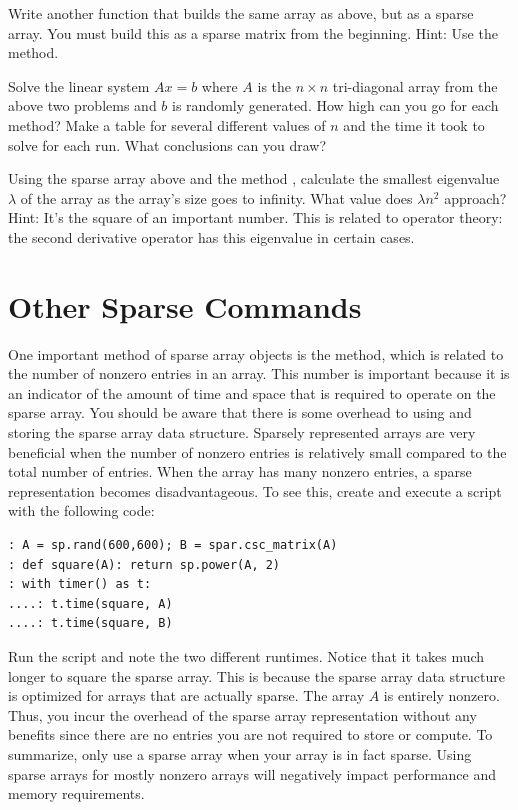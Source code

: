 \begin{problem}
Write another function that builds the same array as above, but as a sparse array. You must build this as a sparse matrix from the beginning. Hint: Use the  method.
\end{problem}

\begin{problem}
Solve the linear system $Ax = b$ where $A$ is the $n\times n$
tri-diagonal array from the above two problems and $b$ is randomly
generated.  How high can you go for each method?  Make a table for
several different values of $n$ and the time it took to solve for
each run.  What conclusions can you draw?
\end{problem}

\begin{problem}
Using the sparse array above and the method , calculate the smallest eigenvalue $\lambda$ of the array as the array's size goes to infinity. What value does $\lambda n^2$ approach?  Hint: It's the square of an important number. This is related to operator theory: the second derivative operator has this eigenvalue in certain cases.
\end{problem}

\section*{Other Sparse Commands}

One important method of sparse array objects is the  method, which is related to the number of nonzero entries in an array.  This number is important because it is an indicator of the amount of time and space that is required to operate on the sparse array. You should be aware that there is some overhead to using and storing the sparse array data structure. Sparsely represented arrays are very beneficial when the number of nonzero entries is relatively small compared to the total number of entries. When the array has many nonzero entries, a sparse representation becomes disadvantageous. To see this, create and execute a script with the following code:
\begin{lstlisting}[style=python]
: A = sp.rand(600,600); B = spar.csc_matrix(A)
: def square(A): return sp.power(A, 2)
: with timer() as t:
....: t.time(square, A)
....: t.time(square, B)
\end{lstlisting}

Run the script and note the two different runtimes. Notice that it takes much longer to square the sparse array. This is because the sparse array data structure is optimized for arrays that are actually sparse. The array $A$ is entirely nonzero. Thus, you incur the overhead of the sparse array representation without any benefits since there are no entries you are not required to store or compute. To summarize, only use a sparse array when your array is in fact sparse. Using sparse arrays for mostly nonzero arrays will negatively impact performance and memory requirements.


